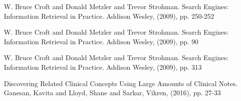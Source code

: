\documentclass[runningheads]{llncs}
\begin{document}
\begin{thebibliography}{8}

W. Bruce Croft and Donald Metzler and Trevor Strohman. Search Engines: Information Retrieval in Practice. Addison Wesley, (2009), pp. 250-252

W. Bruce Croft and Donald Metzler and Trevor Strohman. Search Engines: Information Retrieval in Practice. Addison Wesley, (2009), pp. 90

W. Bruce Croft and Donald Metzler and Trevor Strohman. Search Engines: Information Retrieval in Practice. Addison Wesley, (2009), pp. 313

Discovering Related Clinical Concepts Using Large Amounts of Clinical Notes. Ganesan, Kavita and Lloyd, Shane and Sarkar,
 Vikren, (2016), pp. 27-33

\end{thebibliography}

\begin{figure}[h!]
\end{figure}
\end{document}
